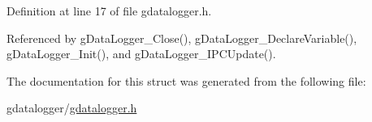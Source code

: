 Definition at line 17 of file gdatalogger.\-h.



Referenced by g\-Data\-Logger\-\_\-\-Close(), g\-Data\-Logger\-\_\-\-Declare\-Variable(), g\-Data\-Logger\-\_\-\-Init(), and g\-Data\-Logger\-\_\-\-I\-P\-C\-Update().



The documentation for this struct was generated from the following file\-:\begin{DoxyCompactItemize}
\item 
gdatalogger/\hyperlink{gdatalogger_8h}{gdatalogger.\-h}\end{DoxyCompactItemize}
